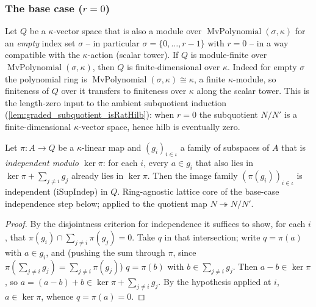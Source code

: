 \subsubsection*{The base case ($r = 0$)}

\begin{lemma}\leanok
  \label{lem:graded_finiteDimensional_of_mvPolynomial_isEmpty_finite}
  Let \(Q\) be a \(\kappa\)-vector space that is also a module over
  \(\operatorname{MvPolynomial}(\sigma, \kappa)\) for an \emph{empty} index set
  \(\sigma\) -- in particular \(\sigma = \{0, \dots, r-1\}\) with \(r = 0\) -- in a way
  compatible with the \(\kappa\)-action (scalar tower). If \(Q\) is module-finite over
  \(\operatorname{MvPolynomial}(\sigma, \kappa)\), then \(Q\) is finite-dimensional over
  \(\kappa\). Indeed for empty \(\sigma\) the polynomial ring is
  \(\operatorname{MvPolynomial}(\sigma, \kappa) \cong \kappa\), a finite \(\kappa\)-module,
  so finiteness of \(Q\) over it transfers to finiteness over \(\kappa\) along the scalar
  tower. This is the length-zero input to the ambient subquotient induction
  (\cref{lem:graded_subquotient_isRatHilb}): when \(r = 0\) the subquotient \(N/N'\) is a
  finite-dimensional \(\kappa\)-vector space, hence \(\mathrm{hilb}\) is eventually zero.
\end{lemma}

\begin{lemma}\leanok
  \label{lem:graded_iSupIndep_map_of_mem_ker_sup}
  Let \(\pi : A \to Q\) be a \(\kappa\)-linear map and \((g_i)_{i \in \iota}\) a family of
  subspaces of \(A\) that is \emph{independent modulo \(\ker\pi\)}: for each \(i\), every
  \(a \in g_i\) that also lies in \(\ker\pi + \sum_{j \ne i} g_j\) already lies in
  \(\ker\pi\). Then the image family \((\pi(g_i))_{i \in \iota}\) is independent
  (\(\mathrm{iSupIndep}\)) in \(Q\). Ring-agnostic lattice core of the base-case
  independence step below; applied to the quotient map \(N \twoheadrightarrow N/N'\).
\end{lemma}
\begin{proof}

\leanok
  By the disjointness criterion for independence it suffices to show, for each \(i\),
  that \(\pi(g_i) \cap \sum_{j \ne i} \pi(g_j) = 0\). Take \(q\) in that intersection;
  write \(q = \pi(a)\) with \(a \in g_i\), and (pushing the sum through \(\pi\), since
  \(\pi(\sum_{j\ne i} g_j) = \sum_{j\ne i}\pi(g_j)\)) \(q = \pi(b)\) with
  \(b \in \sum_{j \ne i} g_j\). Then \(a - b \in \ker\pi\), so
  \(a = (a-b) + b \in \ker\pi + \sum_{j \ne i} g_j\). By the hypothesis applied at \(i\),
  \(a \in \ker\pi\), whence \(q = \pi(a) = 0\).
\end{proof}

